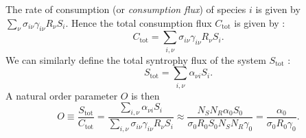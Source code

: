 \documentclass[12pt, titlepage]{report}
\begin{document}
The rate of consumption (or \textit{consumption flux}) of species $i$ is given by $\sum_\nu \sigma_{i\nu}\gamma_{i\nu}R_\nu S_i$. Hence the total consumption flux $C_{\text{tot}}$ is given by :
\begin{equation}
C_{\text{tot}} = \sum_{i, \nu} \sigma_{i\nu} \gamma_{i\nu}R_\nu S_i.
\end{equation}
We can similarly define the total syntrophy flux of the system $S_{\text{tot}}$ :
\begin{equation}
S_{\text{tot}} = \sum_{i, \nu} \alpha_{\nu i} S_i.
\end{equation}
A natural order parameter $O$ is then
\begin{equation}
O \equiv \frac{S_{\text{tot}}}{C_{\text{tot}}} = \frac{\sum_{i, \nu} \alpha_{\nu i} S_i}{\sum_{i,\nu}\sigma_{i\nu} \gamma_{i\nu}R_\nu S_i} \approx \frac{N_S N_R \alpha_0 S_0}{\sigma_0 R_0 S_0 N_S N_R \gamma_0} = \frac{\alpha_0}{\sigma_0 R_0 \gamma_0}.
\end{equation}
\end{document}
